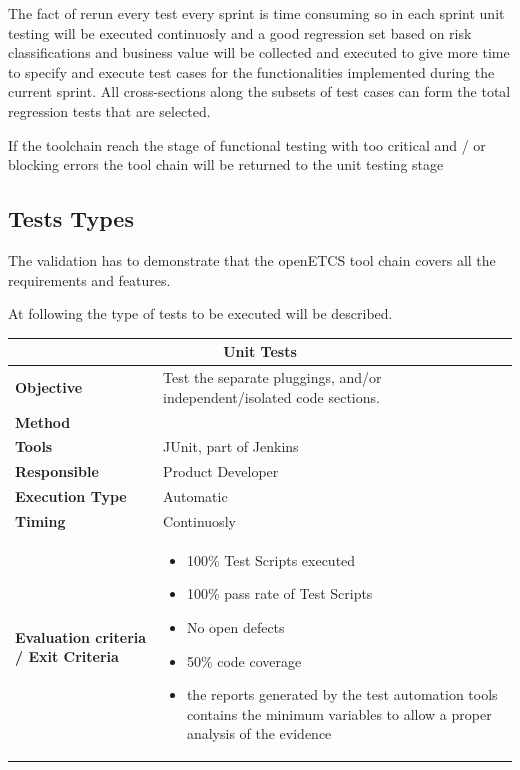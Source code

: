 The fact of rerun every test every sprint is time consuming so in each sprint unit testing will be executed continuosly and a good regression set based on risk classifications and business value will be collected and executed to give more time to specify and execute test cases for the functionalities implemented during the current sprint. All cross-sections along the subsets of test cases can form the total regression tests that are selected.

If the toolchain reach the stage of functional testing with too critical and / or blocking errors the tool chain will be returned to the unit testing stage

\subsection{Tests Types}
The validation has to demonstrate that the openETCS tool chain covers all the requirements and features.

At following the type of tests to be executed will be described.

\begin{center}
\begin{longtable}[H]{|p{4cm}|p{9cm}|}\hline
\multicolumn{2}{|c|}{\textbf{Unit Tests}}\\\hline
\textbf{Objective} &  Test the separate pluggings, and/or independent/isolated code sections.\\\hline
\textbf{Method} & \\\hline
\textbf{Tools} & JUnit, part of Jenkins\\\hline
\textbf{Responsible} & Product Developer\\\hline
\textbf{Execution Type} & Automatic\\\hline
\textbf{Timing} & Continuosly \\\hline
\textbf{Evaluation criteria / Exit Criteria} & \begin{itemize}
\item 100\% Test Scripts executed
\item 100\% pass rate of Test Scripts
\item No open defects
\item 50\% code coverage
\item the reports generated by the test automation tools contains the minimum variables to allow a proper analysis of the evidence
\end{itemize} \\\hline
\end{longtable}
\end{center}


